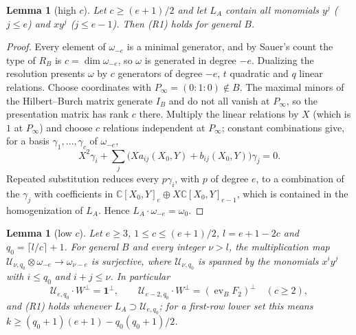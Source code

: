 \documentclass{amsart}
\newtheorem{lemma}[theorem]{Lemma}
\theoremstyle{definition}
\theoremstyle{remark}
\numberwithin{equation}{section}
\newcommand{\CC}{\mathbb{C}}
\DeclareMathOperator{\ev}{ev}
\begin{document}
\begin{lemma}[high $c$]\label{lem:R1high}
Let $c\ge(e+1)/2$ and let $L_A$ contain all monomials $y^j$ ($j\le e$) and $xy^j$
($j\le e-1$). Then (R1) holds for general $B$.
\end{lemma}

\begin{proof}
Every element of $\omega_{-e}$ is a minimal generator, and by Sauer's count the type of
$R_B$ is $c=\dim\omega_{-e}$, so $\omega$ is generated in degree $-e$. Dualizing the
resolution presents $\omega$ by $c$ generators of degree $-e$, $t$ quadratic and $q$
linear relations. Choose coordinates with $P_\infty=(0:1:0)\notin B$. The maximal minors
of the Hilbert--Burch matrix generate $I_B$ and do not all vanish at $P_\infty$, so the
presentation matrix has rank $c$ there. Multiply the linear relations by $X$ (which is
$1$ at $P_\infty$) and choose $c$ relations independent at $P_\infty$; constant
combinations give, for a basis $\gamma_1,\dots,\gamma_c$ of $\omega_{-e}$,
\[
  X^2\gamma_i+\sum_j\bigl(Xa_{ij}(X_0,Y)+b_{ij}(X_0,Y)\bigr)\gamma_j=0 .
\]
Repeated substitution reduces every $p\gamma_i$, with $p$ of degree $e$, to a
combination of the $\gamma_j$ with coefficients in
$\CC[X_0,Y]_e\oplus X\CC[X_0,Y]_{e-1}$, which is contained in the homogenization of $L_A$.
Hence $L_A\cdot\omega_{-e}=\omega_0$.
\end{proof}

\begin{lemma}[low $c$]\label{lem:R1low}
Let $e\ge3$, $1\le c\le(e+1)/2$, $l=e+1-2c$ and $q_0=\lceil l/c\rceil+1$. For general $B$
and every integer $\nu>l$, the multiplication map $\mathcal U_{\nu,q_0}\otimes\omega_{-e}
\to\omega_{\nu-e}$ is surjective, where $\mathcal U_{\nu,q_0}$ is spanned by the
monomials $x^iy^j$ with $i\le q_0$ and $i+j\le\nu$. In particular
\[
  \mathcal U_{e,q_0}\cdot W^\perp=\mathbf1^\perp,\qquad
  \mathcal U_{e-2,q_0}\cdot W^\perp=(\ev_BF_2)^\perp\quad(c\ge2),
\]
and (R1) holds whenever $L_A\supset\mathcal U_{e,q_0}$; for a first-row lower set this
means $k\ge(q_0+1)(e+1)-q_0(q_0+1)/2$.
\end{lemma}
\end{document}
